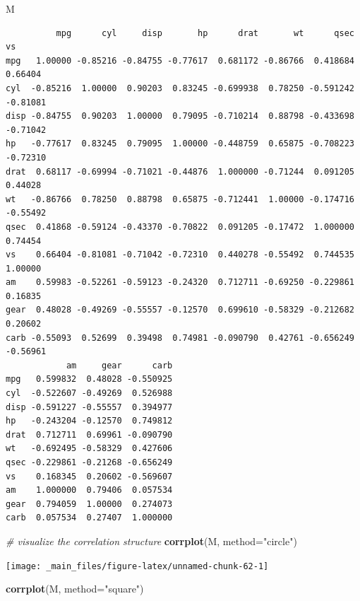 \documentclass[
]{book}
\newenvironment{Shaded}{\begin{snugshade}}{\end{snugshade}}
\newcommand{\CommentTok}[1]{\textcolor[rgb]{0.56,0.35,0.01}{\textit{#1}}}
\newcommand{\DataTypeTok}[1]{\textcolor[rgb]{0.13,0.29,0.53}{#1}}
\newcommand{\KeywordTok}[1]{\textcolor[rgb]{0.13,0.29,0.53}{\textbf{#1}}}
\newcommand{\NormalTok}[1]{#1}
\newcommand{\StringTok}[1]{\textcolor[rgb]{0.31,0.60,0.02}{#1}}
\begin{document}
\begin{Shaded}
\begin{Highlighting}[]
\NormalTok{M}
\end{Highlighting}
\end{Shaded}

\begin{verbatim}
          mpg      cyl     disp       hp      drat       wt      qsec       vs
mpg   1.00000 -0.85216 -0.84755 -0.77617  0.681172 -0.86766  0.418684  0.66404
cyl  -0.85216  1.00000  0.90203  0.83245 -0.699938  0.78250 -0.591242 -0.81081
disp -0.84755  0.90203  1.00000  0.79095 -0.710214  0.88798 -0.433698 -0.71042
hp   -0.77617  0.83245  0.79095  1.00000 -0.448759  0.65875 -0.708223 -0.72310
drat  0.68117 -0.69994 -0.71021 -0.44876  1.000000 -0.71244  0.091205  0.44028
wt   -0.86766  0.78250  0.88798  0.65875 -0.712441  1.00000 -0.174716 -0.55492
qsec  0.41868 -0.59124 -0.43370 -0.70822  0.091205 -0.17472  1.000000  0.74454
vs    0.66404 -0.81081 -0.71042 -0.72310  0.440278 -0.55492  0.744535  1.00000
am    0.59983 -0.52261 -0.59123 -0.24320  0.712711 -0.69250 -0.229861  0.16835
gear  0.48028 -0.49269 -0.55557 -0.12570  0.699610 -0.58329 -0.212682  0.20602
carb -0.55093  0.52699  0.39498  0.74981 -0.090790  0.42761 -0.656249 -0.56961
            am     gear      carb
mpg   0.599832  0.48028 -0.550925
cyl  -0.522607 -0.49269  0.526988
disp -0.591227 -0.55557  0.394977
hp   -0.243204 -0.12570  0.749812
drat  0.712711  0.69961 -0.090790
wt   -0.692495 -0.58329  0.427606
qsec -0.229861 -0.21268 -0.656249
vs    0.168345  0.20602 -0.569607
am    1.000000  0.79406  0.057534
gear  0.794059  1.00000  0.274073
carb  0.057534  0.27407  1.000000
\end{verbatim}

\begin{Shaded}
\begin{Highlighting}[]
\CommentTok{# visualize the correlation structure}
\KeywordTok{corrplot}\NormalTok{(M, }\DataTypeTok{method=}\StringTok{"circle"}\NormalTok{)}
\end{Highlighting}
\end{Shaded}

\begin{center}\texttt{[image: \_main\_files/figure-latex/unnamed-chunk-62-1]} \end{center}

\begin{Shaded}
\begin{Highlighting}[]
\KeywordTok{corrplot}\NormalTok{(M, }\DataTypeTok{method=}\StringTok{"square"}\NormalTok{)}
\end{Highlighting}
\end{Shaded}
\end{document}
